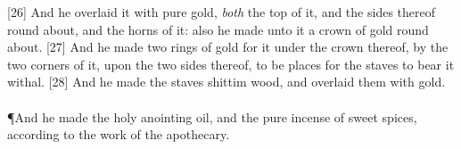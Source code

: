 [26] \textcolor[cmyk]{0.99998,1,0,0}{And he overlaid it with pure gold, \emph{both} the top of it, and the sides thereof round about, and the horns of it: also he made unto it a crown of gold round about.}
[27] \textcolor[cmyk]{0.99998,1,0,0}{And he made two rings of gold for it under the crown thereof, by the two corners of it, upon the two sides thereof, to be places for the staves to bear it withal.}
[28] \textcolor[cmyk]{0.99998,1,0,0}{And he made the staves  shittim wood, and overlaid them with gold.}\\
\\
\P \textcolor[cmyk]{0.99998,1,0,0}{And he made the holy anointing oil, and the pure incense of sweet spices, according to the work of the apothecary.}
